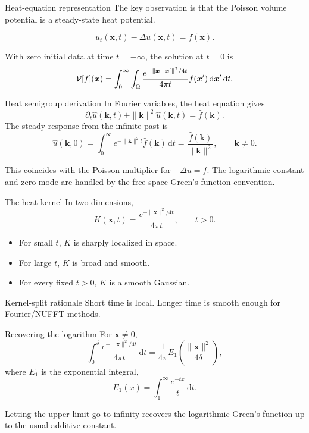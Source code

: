 \documentclass[aspectratio=169,11pt]{beamer}
\newcommand{\dd}{\,\mathrm d}
\newcommand{\x}{\bm{x}}
\newcommand{\xp}{\bm{x}'}
\newcommand{\kvec}{\bm{k}}
\begin{document}
\begin{frame}{Heat-equation representation}
\small
The key observation is that the Poisson volume potential is a steady-state
heat potential.

\[
  u_t(\x,t)-\Delta u(\x,t)=f(\x).
\]

With zero initial data at time $t=-\infty$, the solution at $t=0$ is
\[
  \Vop[f](\x)
  =
  \int_0^\infty\int_{\Omega}
  \frac{e^{-\|\x-\xp\|^2/4t}}{4\pi t}
  f(\xp)\dd\xp\dd t.
\]
\end{frame}

\begin{frame}{Heat semigroup derivation}
\small
In Fourier variables, the heat equation gives
\[
  \partial_t\widehat u(\kvec,t)+\|\kvec\|^2\widehat u(\kvec,t)=\widehat f(\kvec).
\]
The steady response from the infinite past is
\[
  \widehat u(\kvec,0)
  =
  \int_0^\infty e^{-\|\kvec\|^2t}\widehat f(\kvec)\dd t
  =
  \frac{\widehat f(\kvec)}{\|\kvec\|^2},
  \qquad \kvec\ne0.
\]

\vspace{1mm}
This coincides with the Poisson multiplier for $-\Delta u=f$.  The logarithmic
constant and zero mode are handled by the free-space Green's function convention.
\end{frame}

\begin{frame}{The heat kernel}
\small
In two dimensions,
\[
  K(\x,t)=\frac{e^{-\|\x\|^2/4t}}{4\pi t},\qquad t>0.
\]

\begin{itemize}
  \item For small $t$, $K$ is sharply localized in space.
  \item For large $t$, $K$ is broad and smooth.
  \item For every fixed $t>0$, $K$ is a smooth Gaussian.
\end{itemize}

\begin{block}{Kernel-split rationale}
Short time is local. Longer time is smooth enough for Fourier/NUFFT methods.
\end{block}
\end{frame}

\begin{frame}{Recovering the logarithm}
\small
For $\x\ne 0$,
\[
  \int_0^\delta
  \frac{e^{-\|\x\|^2/4t}}{4\pi t}\dd t
  =
  \frac{1}{4\pi}E_1\!\left(\frac{\|\x\|^2}{4\delta}\right),
\]
where $E_1$ is the exponential integral,
\[
  E_1(x)=\int_1^\infty \frac{e^{-tx}}{t}\dd t.
\]

Letting the upper limit go to infinity recovers the logarithmic Green's
function up to the usual additive constant.
\end{frame}
\end{document}

